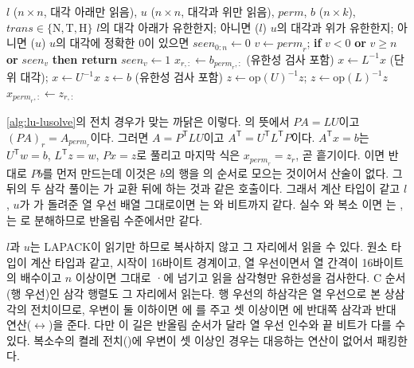 \begin{algorithm}[t]
\begin{algorithmic}[1]
\Require $l$ ($n\times n$, 대각 아래만 읽음), $u$ ($n\times n$, 대각과 위만 읽음), $\mathit{perm}$, $b$ ($n\times k$), $\mathit{trans}\in\{\mathrm N,\mathrm T,\mathrm H\}$
\State $l$의 대각 아래가 유한한지; 아니면 \Return {}($l$)
\State $u$의 대각과 위가 유한한지; 아니면 \Return {}($u$)
\State $u$의 대각에 정확한 $0$이 있으면 \Return {}
\State $\mathit{seen}_{0:n}\gets0$
 
  \State $v\gets\mathit{perm}_r$; \textbf{if} $v<0$ \textbf{or} $v\ge n$ \textbf{or} $\mathit{seen}_v$ \textbf{then return} 
  \State $\mathit{seen}_v\gets1$
\EndFor
{}
  \State $x_{r,:}\gets b_{\mathit{perm}_r,:}$ (유한성 검사 포함) 
  \State $x\gets L^{-1}x$ (단위 대각); $x\gets U^{-1}x$
\Else
  \State $z\gets b$ (유한성 검사 포함)
  \State $z\gets\mathrm{op}(U)^{-1}z$; $z\gets\mathrm{op}(L)^{-1}z$ 
  \State $x_{\mathit{perm}_r,:}\gets z_{r,:}$ 
\EndIf
\end{algorithmic}
\caption{의 배치 원소 하나}
\label{alg:lu-lusolve}
\end{algorithm}

\cref{alg:lu-lusolve}의 전치 경우가 맞는 까닭은 이렇다. 의 뜻에서 $PA=LU$이고 $(PA)_r=A_{\mathit{perm}_r}$이다. 그러면 $A=P^{\mathsf T}LU$이고 $A^{\mathsf T}=U^{\mathsf T}L^{\mathsf T}P$이다. $A^{\mathsf T}x=b$는 $U^{\mathsf T}w=b$, $L^{\mathsf T}z=w$, $Px=z$로 풀리고 마지막 식은 $x_{\mathit{perm}_r}=z_r$, 곧 흩기이다. 이면 반대로 $Pb$를 먼저 만드는데 이것은 $b$의 행을 의 순서로 모으는 것이어서 산술이 없다. 그 뒤의 두 삼각 풀이는 가 교환 뒤에 하는 것과 같은 호출이다. 그래서 계산 타입이 같고 $l$, $u$가 가 돌려준 열 우선 배열 그대로이면 는 와 비트까지 같다. 실수 와 복소 이면 는 , 는 로 분해하므로 반올림 수준에서만 같다.

$l$과 $u$는 LAPACK이 읽기만 하므로 복사하지 않고 그 자리에서 읽을 수 있다. 원소 타입이 계산 타입과 같고, 시작이 16바이트 경계이고, 열 우선이면서 열 간격이 16바이트의 배수이고 $n$ 이상이면 그대로 ·에 넘기고 읽을 삼각형만 유한성을 검사한다. C 순서(행 우선)인 삼각 행렬도 그 자리에서 읽는다. 행 우선의 하삼각은 열 우선으로 본 상삼각의 전치이므로, 우변이 둘 이하이면 에 를 주고 셋 이상이면 에 반대쪽 삼각과 반대 연산($\leftrightarrow$)을 준다. 다만 이 길은 반올림 순서가 달라 열 우선 인수와 끝 비트가 다를 수 있다. 복소수의 켤레 전치()에 우변이 셋 이상인 경우는 대응하는 연산이 없어서 패킹한다.

